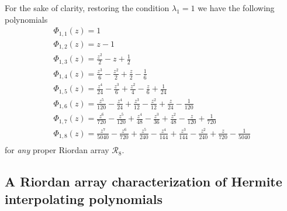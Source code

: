 For the sake of clarity, restoring the condition $\lambda_{1}=1$ we have the following polynomials
\begin{displaymath}
\begin{array}{c}
 \Phi_{ 1, 1 }{\left (z \right )} = 1\\
 \Phi_{ 1, 2 }{\left (z \right )} = z - 1\\
 \Phi_{ 1, 3 }{\left (z \right )} = \frac{z^{2}}{2} - z + \frac{1}{2}\\
 \Phi_{ 1, 4 }{\left (z \right )} = \frac{z^{3}}{6} - \frac{z^{2}}{2} + \frac{z}{2} - \frac{1}{6}\\
 \Phi_{ 1, 5 }{\left (z \right )} = \frac{z^{4}}{24} - \frac{z^{3}}{6} + \frac{z^{2}}{4} - \frac{z}{6} + \frac{1}{24}\\
 \Phi_{ 1, 6 }{\left (z \right )} = \frac{z^{5}}{120} - \frac{z^{4}}{24} + \frac{z^{3}}{12} - \frac{z^{2}}{12} + \frac{z}{24} - \frac{1}{120}\\
 \Phi_{ 1, 7 }{\left (z \right )} = \frac{z^{6}}{720} - \frac{z^{5}}{120} + \frac{z^{4}}{48} - \frac{z^{3}}{36} + \frac{z^{2}}{48} - \frac{z}{120} + \frac{1}{720}\\
 \Phi_{ 1, 8 }{\left (z \right )} = \frac{z^{7}}{5040} - \frac{z^{6}}{720} + \frac{z^{5}}{240} - \frac{z^{4}}{144} + \frac{z^{3}}{144} - \frac{z^{2}}{240} + \frac{z}{720} - \frac{1}{5040}\\
\end{array}
\end{displaymath}
for \textit{any} proper Riordan array $\mathcal{R}_{8}$.

\subsection{A Riordan array characterization of Hermite interpolating polynomials}

